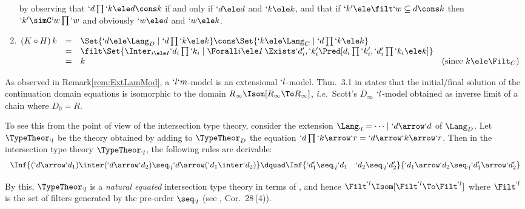\documentclass{CSML}
\def\ie{\emph{i.e.}}
\begin{document}
\begin{enumerate}
\noindent
by observing that $`d\prod `k \ele d\cons k$ if and only if $`d \ele d$ and $`k \ele k$, and that if $`k' \ele \filt`w \subseteq d\cons k$ then $`k' \simC `w\prod `w$ and obviously $`w \ele d$ and $`w \ele k$.

 \item
 $ \begin{array}[t]{@{}llll}
	(K \circ H)\, k & = &
	\Set{`d \ele \Lang_D \mid `d\prod `k \ele k } \cons \Set{`k \ele \Lang_C \mid `d\prod `k \ele k } \\ 
	& = & \filt \Set{\Inter_{i \ele I}`d_i\prod `k_i \mid \Forall i \ele I \, \Exists `d'_i, `k'_i \Pred [ d_i\prod `k'_i, `d'_i\prod `k_i \ele k ] } \\
	& = & k & (\textrm{since }k \ele \Filt_C )
 \end{array} $
\arrayqed
 \end{enumerate}


 \begin{rem} \label{rem:naturalEquated}
As observed in Remark\skp\ref{rem:ExtLamMod}, a $`l`m$-model is an extensional $`l$-model. 
Thm.~3.1 in \cite{Streicher-Reus'98} states that the initial/final solution of the continuation domain equations is isomorphic to the domain $R_ \infty \Isom [R_ \infty\To R_\infty]$, \ie~Scott's $D_\infty$ $`l$-model obtained as inverse limit of a chain where $D_0 = R$.

To see this from the point of view of the intersection type theory, consider the extension $\Lang_{`l} = \dots \mid `d\arrow `d $ of $\Lang_{D }$. Let $ \TypeTheor_{`l}$ be the theory obtained by adding to $ \TypeTheor_D$ the equation $ `d\prod `k\arrow `r = `d\arrow `k\arrow `r $.
Then in the intersection type theory $ \TypeTheor_{`l}$, the following rules are derivable:
%
 \[ \begin{array}{c@{\dquad}c}
\Inf	{(`d\arrow `d_1) \inter (`d\arrow `d_2) \seq_{`l} `d\arrow(`d_1 \inter`d_2) }
&
\Inf	{`d'_1 \seq_{`l} `d_1 \quad `d_2 \seq_{`l} `d'_2
	}{ `d_1\arrow `d_2 \seq_{`l} `d'_1\arrow `d'_2 }
 \end{array} \]
 
By this, $ \TypeTheor_{`l}$ is a \emph{natural equated} intersection type theory in terms of \cite{Alessi-Severi'08},
and hence $ \Filt^{`l} \Isom [ \Filt^{`l}\To\Filt^{`l}]$ where $ \Filt^{`l}$ is the set of filters generated by the pre-order $\seq_{`l}$ (see \cite{Alessi-Severi'08}, Cor.~28\,(4)). 
 \end{rem}
\end{document}
